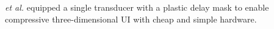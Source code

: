  \emph{et al.} \cite{article:KruizingaSciAdv2017} equipped
a single transducer with
a plastic delay mask to enable
compressive three-dimensional \ac{UI} with
cheap and simple hardware.
